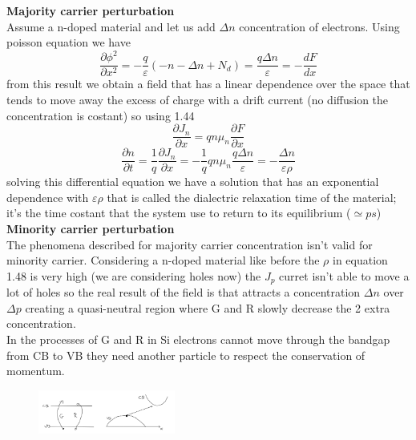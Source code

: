 \vspace{5mm}
{\bf Majority carrier perturbation}\\
Assume a n-doped material and let us add $\Delta n$ concentration of electrons. Using poisson equation we have
\begin{equation}
\frac{\partial \phi^2}{\partial x^2}=-\frac{q}{\varepsilon}\left(-n-\Delta n + N_d\right)=\frac{q\Delta n}{\varepsilon}=-\frac{dF}{dx} 
\end{equation}
from this result we obtain a field that has a linear dependence over the space that tends to move away the excess of charge with a drift current (no diffusion the concentration is costant) so using  1.44
\begin{equation}
\frac{\partial J_n}{\partial x}=qn\mu_n\frac{\partial F}{\partial x}
\end{equation}
\begin{equation}
\frac{\partial n}{\partial t}=\frac{1}{q}\frac{\partial J_n}{\partial x}=-\frac{1}{q}qn\mu_n\frac{q\Delta n}{\varepsilon}=-\frac{\Delta n}{\varepsilon \rho}
\end{equation}
solving this differential equation we have a solution that has an exponential dependence with $\varepsilon \rho$ that is called the dialectric relaxation time of the material; it's the time costant that the system use to return to its equilibrium ($\simeq ps$)\\

\vspace{5mm}
{\bf Minority carrier perturbation}\\
The phenomena described for majority carrier concentration isn't valid for minority carrier. Considering a n-doped material like before the $\rho$ in equation 1.48 is very high (we are considering holes now) the $J_p$ curret isn't able to move a lot of holes so the real result of the field is that attracts a concentration $\Delta n$ over $\Delta p$ creating a quasi-neutral region where G and R slowly decrease the 2 extra concentration.\\
In the processes of G and R in Si electrons cannot move 
through the bandgap from CB to VB they need another particle to respect the conservation of momentum.\\

\begin{figure}
\includegraphics[width=0.4\textwidth]{srhp1.png}
\end{figure}

